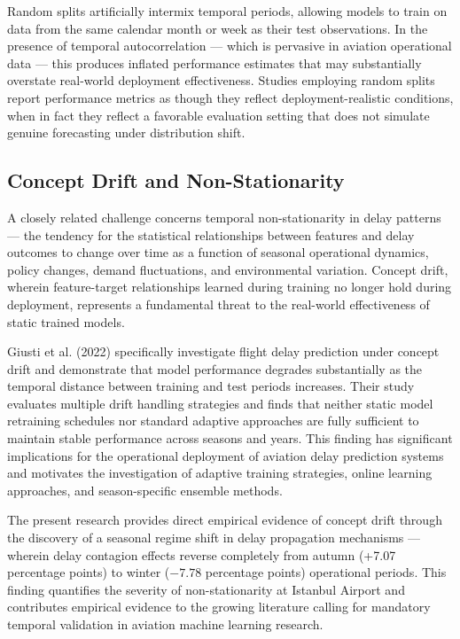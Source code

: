 \documentclass{report}
\begin{document}
Random splits artificially intermix temporal periods, allowing models to train on data from the same calendar month or week as their test observations. In the presence of temporal autocorrelation --- which is pervasive in aviation operational data --- this produces inflated performance estimates that may substantially overstate real-world deployment effectiveness. Studies employing random splits report performance metrics as though they reflect deployment-realistic conditions, when in fact they reflect a favorable evaluation setting that does not simulate genuine forecasting under distribution shift.

\subsection{Concept Drift and Non-Stationarity}

A closely related challenge concerns temporal non-stationarity in delay patterns --- the tendency for the statistical relationships between features and delay outcomes to change over time as a function of seasonal operational dynamics, policy changes, demand fluctuations, and environmental variation. Concept drift, wherein feature-target relationships learned during training no longer hold during deployment, represents a fundamental threat to the real-world effectiveness of static trained models.

Giusti et al. (2022) specifically investigate flight delay prediction under concept drift and demonstrate that model performance degrades substantially as the temporal distance between training and test periods increases. Their study evaluates multiple drift handling strategies and finds that neither static model retraining schedules nor standard adaptive approaches are fully sufficient to maintain stable performance across seasons and years. This finding has significant implications for the operational deployment of aviation delay prediction systems and motivates the investigation of adaptive training strategies, online learning approaches, and season-specific ensemble methods.

The present research provides direct empirical evidence of concept drift through the discovery of a seasonal regime shift in delay propagation mechanisms --- wherein delay contagion effects reverse completely from autumn (+7.07 percentage points) to winter ($-7.78$ percentage points) operational periods. This finding quantifies the severity of non-stationarity at Istanbul Airport and contributes empirical evidence to the growing literature calling for mandatory temporal validation in aviation machine learning research.
\end{document}
